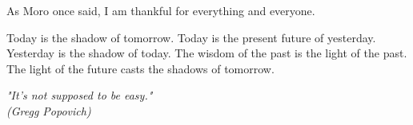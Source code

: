 \documentclass[12pt, %
               openright, %
               oneside, %
               a4paper, %
               chapter=TITLE, %
               section=TITLE, %
               brazil,
               english %
]{abntex2}
\begin{document}
\begin{agradecimentos}
 As Moro once said, I am thankful for everything and everyone.

 Today is the shadow of tomorrow. Today is the present future of
 yesterday. Yesterday is the shadow of today. The wisdom of the past is
 the light of the past. The light of the future casts the shadows of
 tomorrow.
\end{agradecimentos}

\begin{epigrafe}
  \vspace*{\fill}
  \begin{flushright}
    \textit{"It's not supposed to be easy."\\
             (Gregg Popovich)}
  \end{flushright}
\end{epigrafe}
\newpage
\setlength{\absparsep}{18pt} %
\setlength{\abstitleskip}{1cm} %
\end{document}

